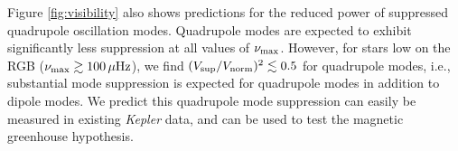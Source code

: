 Figure \ref{fig:visibility} also shows predictions for the reduced power of suppressed quadrupole oscillation modes. Quadrupole modes are expected to exhibit significantly less suppression at all values of $\nu_{\rm max}$. However, for stars low on the RGB ($\nu_{\rm max} \gtrsim 100 \, \mu {\rm Hz}$), we find $(V_{\rm sup}/V_{\rm norm})^2 \lesssim 0.5 $ for quadrupole modes, i.e., substantial mode suppression is expected for quadrupole modes in addition to dipole modes. We predict this quadrupole mode suppression can easily be measured in existing {\it Kepler} data, and can be used to test the magnetic greenhouse hypothesis. 
  
  
  
  
  
